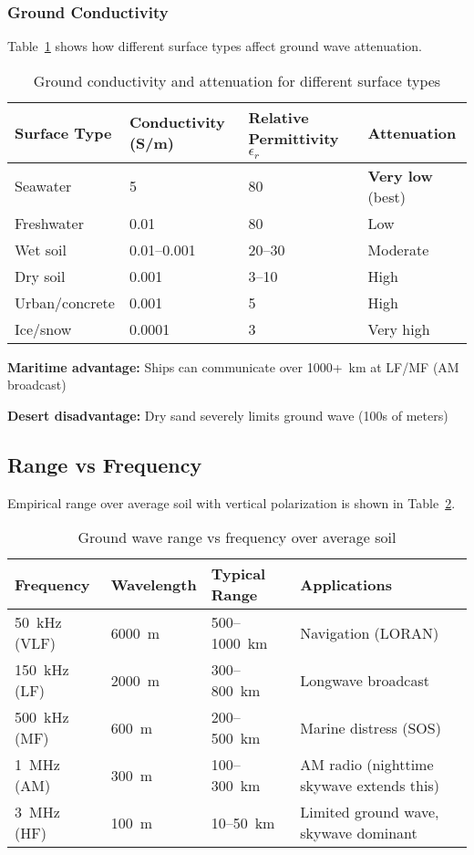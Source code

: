 \subsubsection{Ground Conductivity}

Table~\ref{tab:ground-conductivity} shows how different surface types affect ground wave attenuation.

\begin{table}[htbp]
\centering
\caption{Ground conductivity and attenuation for different surface types}
\label{tab:ground-conductivity}
\begin{tabular}{@{}llll@{}}
\toprule
\textbf{Surface Type} & \textbf{Conductivity (S/m)} & \textbf{Relative Permittivity $\epsilon_r$} & \textbf{Attenuation} \\
\midrule
Seawater & 5 & 80 & \textbf{Very low} (best) \\
Freshwater & 0.01 & 80 & Low \\
Wet soil & 0.01--0.001 & 20--30 & Moderate \\
Dry soil & 0.001 & 3--10 & High \\
Urban/concrete & 0.001 & 5 & High \\
Ice/snow & 0.0001 & 3 & Very high \\
\bottomrule
\end{tabular}
\end{table}

\textbf{Maritime advantage:} Ships can communicate over 1000+~km at LF/MF (AM broadcast)

\textbf{Desert disadvantage:} Dry sand severely limits ground wave (100s of meters)

\subsection{Range vs Frequency}

Empirical range over average soil with vertical polarization is shown in Table~\ref{tab:ground-wave-range}.

\begin{table}[htbp]
\centering
\caption{Ground wave range vs frequency over average soil}
\label{tab:ground-wave-range}
\begin{tabular}{@{}llll@{}}
\toprule
\textbf{Frequency} & \textbf{Wavelength} & \textbf{Typical Range} & \textbf{Applications} \\
\midrule
50~kHz (VLF) & 6000~m & 500--1000~km & Navigation (LORAN) \\
150~kHz (LF) & 2000~m & 300--800~km & Longwave broadcast \\
500~kHz (MF) & 600~m & 200--500~km & Marine distress (SOS) \\
1~MHz (AM) & 300~m & 100--300~km & AM radio (nighttime skywave extends this) \\
3~MHz (HF) & 100~m & 10--50~km & Limited ground wave, skywave dominant \\
\bottomrule
\end{tabular}
\end{table}

